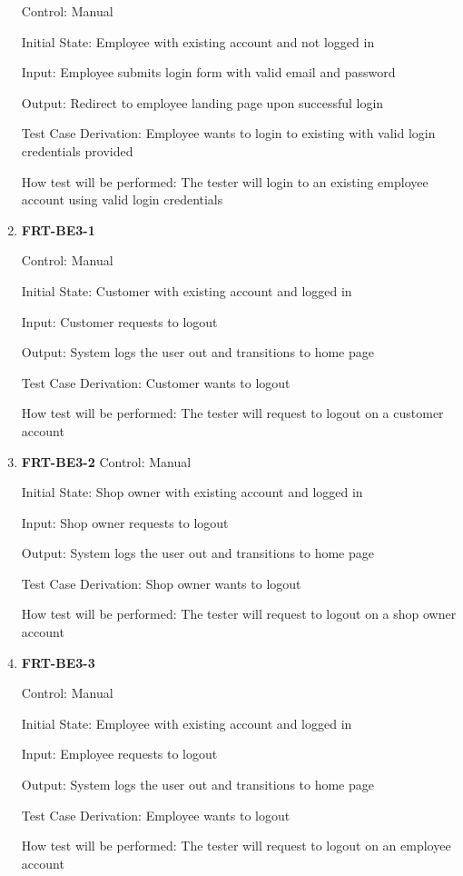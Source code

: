 \documentclass[12pt, titlepage]{article}
\begin{document}
\begin{enumerate}
	      Control: Manual

	      Initial State: Employee with existing account and not logged in

	      Input: Employee submits login form with valid email and password

	      Output: Redirect to employee landing page upon successful login

	      Test Case Derivation: Employee wants to login to existing with valid login credentials provided

	      How test will be performed: The tester will login to an existing employee account using valid login
	      credentials

	\item \textbf{FRT-BE3-1}

	      Control: Manual

	      Initial State: Customer with existing account and logged in

	      Input: Customer requests to logout

	      Output: System logs the user out and transitions to home page

	      Test Case Derivation: Customer wants to logout

	      How test will be performed: The tester will request to logout on a customer account

	\item \textbf{FRT-BE3-2}
	      Control: Manual

	      Initial State: Shop owner with existing account and logged in

	      Input: Shop owner requests to logout

	      Output: System logs the user out and transitions to home page

	      Test Case Derivation: Shop owner wants to logout

	      How test will be performed: The tester will request to logout on a shop owner account

	\item \textbf{FRT-BE3-3}

	      Control: Manual

	      Initial State: Employee with existing account and logged in

	      Input: Employee requests to logout

	      Output: System logs the user out and transitions to home page

	      Test Case Derivation: Employee wants to logout

	      How test will be performed: The tester will request to logout on an employee account

\end{enumerate}
\end{document}
